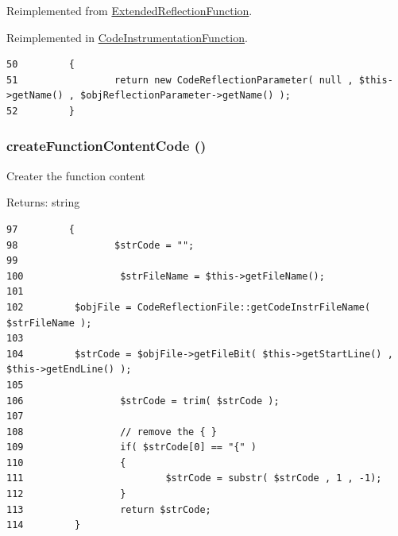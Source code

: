 Reimplemented from \hyperlink{class_extended_reflection_function_98ceb248f2b535a3a83ac2e7990e0c1f}{ExtendedReflectionFunction}.

Reimplemented in \hyperlink{class_code_instrumentation_function_98ceb248f2b535a3a83ac2e7990e0c1f}{CodeInstrumentationFunction}.

\begin{Code}\begin{verbatim}50         {
51                 return new CodeReflectionParameter( null , $this->getName() , $objReflectionParameter->getName() );
52         }
\end{verbatim}
\end{Code}


\hypertarget{class_code_reflection_function_fac80923f7b3c20b2373b50bb2116287}{
\subsubsection[{createFunctionContentCode}]{\setlength{\rightskip}{0pt plus 5cm}createFunctionContentCode ()}}
\label{class_code_reflection_function_fac80923f7b3c20b2373b50bb2116287}


Creater the function content

\begin{Desc}
\item[Returns:]string \end{Desc}


\begin{Code}\begin{verbatim}97         {
98                 $strCode = "";
99 
100                 $strFileName = $this->getFileName();
101 
102         $objFile = CodeReflectionFile::getCodeInstrFileName( $strFileName );
103 
104         $strCode = $objFile->getFileBit( $this->getStartLine() ,  $this->getEndLine() );
105 
106                 $strCode = trim( $strCode );
107 
108                 // remove the { }
109                 if( $strCode[0] == "{" )
110                 {
111                         $strCode = substr( $strCode , 1 , -1);
112                 }
113                 return $strCode;
114         }
\end{verbatim}
\end{Code}


